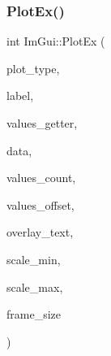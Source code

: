 \mbox{\label{namespaceImGui_a06fa3c299399f4cd5f4a7311ba1ece54}} 
\subsubsection{\texorpdfstring{Plot\+Ex()}{PlotEx()}}
{\footnotesize\ttfamily int Im\+Gui\+::\+Plot\+Ex (\begin{DoxyParamCaption}\item[{\hyperlink{imgui__internal_8h_a9d5efcdd8895aa3544f1e8ce366c2728}{Im\+Gui\+Plot\+Type}}]{plot\+\_\+type,  }\item[{const char $\ast$}]{label,  }\item[{float($\ast$)(\hyperlink{imgui__impl__opengl3__loader_8h_ac668e7cffd9e2e9cfee428b9b2f34fa7}{void} $\ast$\hyperlink{imgui__impl__opengl3__loader_8h_abd87654504355b4c1bb002dcb1d4d16a}{data}, int idx)}]{values\+\_\+getter,  }\item[{\hyperlink{imgui__impl__opengl3__loader_8h_ac668e7cffd9e2e9cfee428b9b2f34fa7}{void} $\ast$}]{data,  }\item[{int}]{values\+\_\+count,  }\item[{int}]{values\+\_\+offset,  }\item[{const char $\ast$}]{overlay\+\_\+text,  }\item[{float}]{scale\+\_\+min,  }\item[{float}]{scale\+\_\+max,  }\item[{\hyperlink{structImVec2}{Im\+Vec2}}]{frame\+\_\+size }\end{DoxyParamCaption})}

\mbox{\label{namespaceImGui_af7a92b2118981835b5251bfdaac50252}} 
